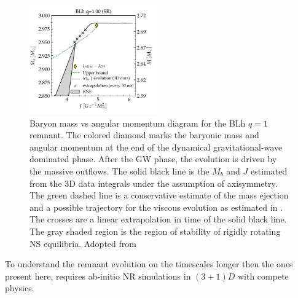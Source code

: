 \documentclass[11pt,a4paper,headinclude=true,DIV=14,BCOR=8mm,chapterprefix,listof=totoc,twoside,openright,abstracton]{scrbook}
\begin{document}
\begin{figure}[t]
    \centering 
    \includegraphics[width=0.49\textwidth]{./figs/ejecta_sec/secular_j_mb_RNS_blh.pdf}
    \caption{Baryon mass vs angular momentum diagram for the BLh $q=1$ remnant.
        The colored diamond marks the baryonic mass and angular momentum at the end
        of the dynamical gravitational-wave dominated phase.
        After the GW phase, the evolution is driven by the massive outflows.
        The solid black line is the $M_b$ and $J$ estimated from the 3D data
        integrals under the assumption of axisymmetry.
        The green dashed line is a conservative estimate
        of the mass ejection and a possible trajectory for the viscous
        evolution as estimated in \citet{Radice:2018xqa}. The crosses are
        a linear extrapolation in time of the solid black line. The gray
        shaded region is the region of stability of rigidly rotating NS equilibria.
        Adopted from \cite{Nedora:2020pak}
    }
    \label{fig:total_j_mb_rns_blh}
\end{figure}

To understand the remnant evolution on the timescales longer then the ones 
present here, requires ab-initio \ac{NR} simulations in $(3+1)D$ with compete physics.
\end{document}

